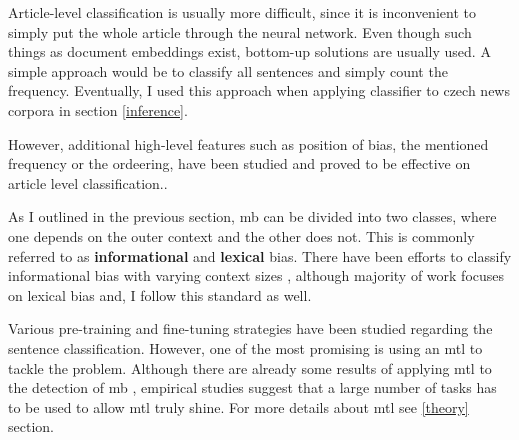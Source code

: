 Article-level classification is usually more difficult, since it is inconvenient to simply put the whole article through the neural network. Even though such things as document embeddings exist, bottom-up solutions are usually used. A simple approach would be to classify all sentences and simply count the frequency. Eventually, I used this approach when applying classifier to czech news corpora in section \ref{inference}.

However, additional high-level features such as position of bias, the mentioned frequency or the ordeering, have been studied and proved to be effective on article level classification.\cite{chen2020detecting,chen-etal-2020-analyzing}.

As I outlined in the previous section, \gls{mb} can be divided into two classes, where one depends on the outer context and the other does not. This is commonly referred to as \textbf{informational} and \textbf{lexical} bias. There have been efforts to classify informational bias with varying context sizes \cite{van2020context}, although majority of work focuses on lexical bias and, I follow this standard as well.

Various pre-training and fine-tuning strategies have been studied regarding the sentence classification. However, one of the most promising is using an \Gls{mtl} to tackle the problem. Although there are already some results of applying \Gls{mtl} to the detection of \gls{mb} \cite{lee2021unifying,spindeexploiting}, empirical studies suggest that a large number of tasks has to be used to allow \Gls{mtl} truly shine. For more details about \gls{mtl} see \ref{theory} section.